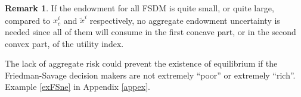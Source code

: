 \documentclass[pdftex]{article}
\numberwithin{equation}{section}
\theoremstyle{th}
\newtheorem{proof lemma}{{Proof Lemma}.}
\theoremstyle{definition}
\newtheorem{remark}{Remark}%
\begin{document}
{%

\begin{remark}
If the endowment for all FSDM is quite small, or quite large, compared to $x^i_c$ and $\tilde{x}^i$ respectively, no aggregate endowment uncertainty is needed since all of them will consume in the first concave part, or in the second convex part, of the utility index.
\end{remark}

The lack of aggregate risk could prevent the existence of equilibrium if the Friedman-Savage decision makers are not extremely ``poor'' or extremely ``rich''. Example \ref{exFSne} in Appendix \ref{appex}.







}
\end{document}
